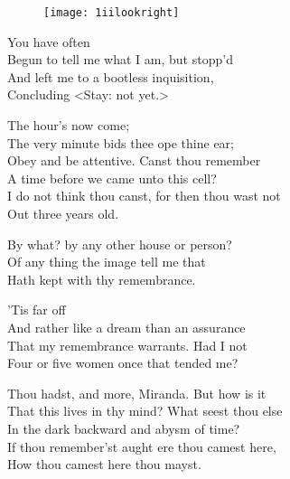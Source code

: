 
\begin{figure}[b]
\centering
\texttt{[image: 1iilookright]}
\end{figure}

\begin{verse_speech}[Miranda] 
You have often\\
Begun to tell me what I am, but stopp'd\\
And left me to a bootless inquisition,\\
Concluding <Stay: not yet.>
\end{verse_speech}

\begin{verse_speech}[Prospero] 
The hour's now come;\\
The very minute bids thee ope thine ear;\\
Obey and be attentive. Canst thou remember\\
A time before we came unto this cell?\\
I do not think thou canst, for then thou wast not\\
Out three years old.
\end{verse_speech}

	
\begin{verse_speech}[Prospero] 
	By what? by any other house or person?\\
Of any thing the image tell me that\\
Hath kept with thy remembrance.
\end{verse_speech}

\begin{verse_speech}[Miranda] 
'Tis far off\\
And rather like a dream than an assurance\\
That my remembrance warrants. Had I not\\
Four or five women once that tended me?
\end{verse_speech}

\begin{verse_speech}[Prospero] 
Thou hadst, and more, Miranda. But how is it\\
That this lives in thy mind? What seest thou else\\
In the dark backward and abysm of time?\\
If thou remember'st aught ere thou camest here,\\
How thou camest here thou mayst.
\end{verse_speech}

